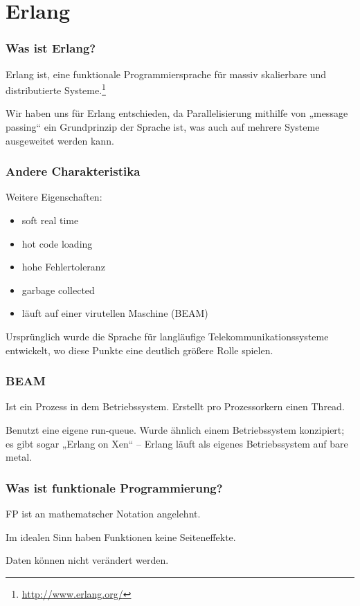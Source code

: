 \documentclass[compress]{beamer}
\begin{document}
\section{Erlang}
\label{sec:erlang}

\begin{frame}
  \frametitle{Was ist Erlang?}

  Erlang ist, eine funktionale Programmiersprache für massiv
  skalierbare und distributierte Systeme.\footnote{\url{http://www.erlang.org/}}

  Wir haben uns für Erlang entschieden, da Parallelisierung mithilfe
  von „message passing“ ein Grundprinzip der Sprache ist, was auch auf
  mehrere Systeme ausgeweitet werden kann.
\end{frame}

\begin{frame}
  \frametitle{Andere Charakteristika}

  Weitere Eigenschaften:
  \begin{itemize}
  \item soft real time
  \item hot code loading
  \item hohe Fehlertoleranz
  \item garbage collected
  \item läuft auf einer virutellen Maschine (BEAM)
  \end{itemize}

  Ursprünglich wurde die Sprache für langläufige
  Telekommunikationssysteme entwickelt, wo diese Punkte eine deutlich
  größere Rolle spielen.
\end{frame}

\begin{frame}
  \frametitle{BEAM}

  Ist ein Prozess in dem Betriebssystem.  Erstellt pro Prozessorkern
  einen Thread.

  Benutzt eine eigene run-queue.  Wurde ähnlich einem Betriebssystem
  konzipiert; es gibt sogar „Erlang on Xen“ – Erlang läuft als eigenes
  Betriebssystem auf bare metal.
\end{frame}

\begin{frame}
  \frametitle{Was ist funktionale Programmierung?}

  FP ist an mathematscher Notation angelehnt.

  Im idealen Sinn haben Funktionen keine Seiteneffekte.

  Daten können nicht verändert werden. %
\end{frame}
\end{document}
